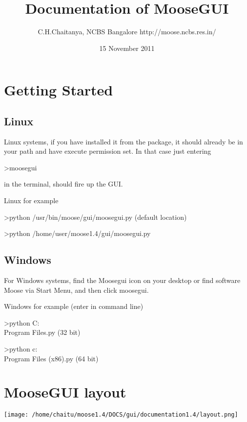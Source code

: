 \documentclass[11pt]{article}
\title{Documentation of MooseGUI }
\author{C.H.Chaitanya, NCBS Bangalore http://moose.ncbs.res.in/}
\date{15 November 2011}
\begin{document}
\maketitle

\setcounter{tocdepth}{3}
\tableofcontents
\vspace*{1cm}

\newpage
\section{Getting Started}
\label{sec-1}




\subsection{Linux}
\label{sec-1.1}


  Linux systems, if you have installed it from the package, it should already be in your path and have execute permission set. In that case just entering

  >moosegui 

  in the terminal, should fire up the GUI.   

  Linux for example 

  >python /usr/bin/moose/gui/moosegui.py (default location)

  >python /home/user/moose1.4/gui/moosegui.py



\subsection{Windows}
\label{sec-1.2}


  For Windows systems, find the Moosegui icon on your desktop or find software Moose via Start Menu, and then click moosegui.

  Windows for example (enter in command line)

  >python C:\\Program Files\MOOSE\gui\moosegui.py (32 bit)

  >python c:\\Program Files (x86)\MOOSEgui\moosegui.py (64 bit)

\newpage
\section{MooseGUI layout}
\label{sec-2}


  \texttt{[image: /home/chaitu/moose1.4/DOCS/gui/documentation1.4/layout.png]}
  
\end{document}
